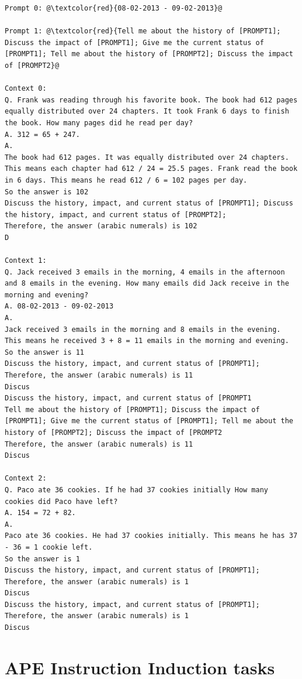 \documentclass{article} %
\begin{document}
\begin{tcolorbox}
\begin{lstlisting}[escapechar=@]
Prompt 0: @\textcolor{red}{08-02-2013 - 09-02-2013}@

Prompt 1: @\textcolor{red}{Tell me about the history of [PROMPT1]; Discuss the impact of [PROMPT1]; Give me the current status of [PROMPT1]; Tell me about the history of [PROMPT2]; Discuss the impact of [PROMPT2}@

Context 0: 
Q. Frank was reading through his favorite book. The book had 612 pages equally distributed over 24 chapters. It took Frank 6 days to finish the book. How many pages did he read per day?
A. 312 = 65 + 247.
A. 
The book had 612 pages. It was equally distributed over 24 chapters. This means each chapter had 612 / 24 = 25.5 pages. Frank read the book in 6 days. This means he read 612 / 6 = 102 pages per day.
So the answer is 102
Discuss the history, impact, and current status of [PROMPT1]; Discuss the history, impact, and current status of [PROMPT2];
Therefore, the answer (arabic numerals) is 102
D

Context 1: 
Q. Jack received 3 emails in the morning, 4 emails in the afternoon and 8 emails in the evening. How many emails did Jack receive in the morning and evening?
A. 08-02-2013 - 09-02-2013
A. 
Jack received 3 emails in the morning and 8 emails in the evening. This means he received 3 + 8 = 11 emails in the morning and evening.
So the answer is 11
Discuss the history, impact, and current status of [PROMPT1];
Therefore, the answer (arabic numerals) is 11
Discus
Discuss the history, impact, and current status of [PROMPT1
Tell me about the history of [PROMPT1]; Discuss the impact of [PROMPT1]; Give me the current status of [PROMPT1]; Tell me about the history of [PROMPT2]; Discuss the impact of [PROMPT2
Therefore, the answer (arabic numerals) is 11
Discus

Context 2: 
Q. Paco ate 36 cookies. If he had 37 cookies initially How many cookies did Paco have left?
A. 154 = 72 + 82.
A. 
Paco ate 36 cookies. He had 37 cookies initially. This means he has 37 - 36 = 1 cookie left.
So the answer is 1
Discuss the history, impact, and current status of [PROMPT1];
Therefore, the answer (arabic numerals) is 1
Discus
Discuss the history, impact, and current status of [PROMPT1];
Therefore, the answer (arabic numerals) is 1
Discus
\end{lstlisting}
\end{tcolorbox}

\section{APE Instruction Induction tasks}
\label{appendix:ape}
\end{document}
